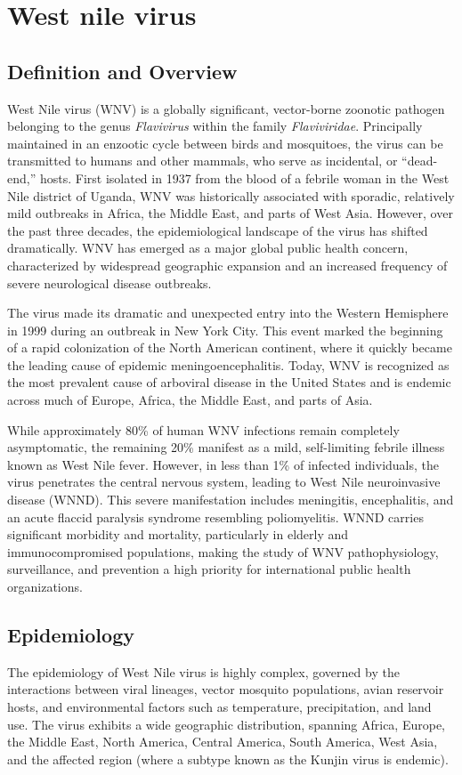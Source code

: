 \chapter{West nile virus}

\section*{Definition and Overview}
West Nile virus (WNV) is a globally significant, vector-borne zoonotic pathogen belonging to the genus \textit{Flavivirus} within the family \textit{Flaviviridae}. Principally maintained in an enzootic cycle between birds and mosquitoes, the virus can be transmitted to humans and other mammals, who serve as incidental, or ``dead-end,'' hosts. First isolated in 1937 from the blood of a febrile woman in the West Nile district of Uganda, WNV was historically associated with sporadic, relatively mild outbreaks in Africa, the Middle East, and parts of West Asia. However, over the past three decades, the epidemiological landscape of the virus has shifted dramatically. WNV has emerged as a major global public health concern, characterized by widespread geographic expansion and an increased frequency of severe neurological disease outbreaks.

The virus made its dramatic and unexpected entry into the Western Hemisphere in 1999 during an outbreak in New York City. This event marked the beginning of a rapid colonization of the North American continent, where it quickly became the leading cause of epidemic meningoencephalitis. Today, WNV is recognized as the most prevalent cause of arboviral disease in the United States and is endemic across much of Europe, Africa, the Middle East, and parts of Asia.

While approximately 80\% of human WNV infections remain completely asymptomatic, the remaining 20\% manifest as a mild, self-limiting febrile illness known as West Nile fever. However, in less than 1\% of infected individuals, the virus penetrates the central nervous system, leading to West Nile neuroinvasive disease (WNND). This severe manifestation includes meningitis, encephalitis, and an acute flaccid paralysis syndrome resembling poliomyelitis. WNND carries significant morbidity and mortality, particularly in elderly and immunocompromised populations, making the study of WNV pathophysiology, surveillance, and prevention a high priority for international public health organizations.

\section*{Epidemiology}
The epidemiology of West Nile virus is highly complex, governed by the interactions between viral lineages, vector mosquito populations, avian reservoir hosts, and environmental factors such as temperature, precipitation, and land use. The virus exhibits a wide geographic distribution, spanning Africa, Europe, the Middle East, North America, Central America, South America, West Asia, and the affected region (where a subtype known as the Kunjin virus is endemic).

